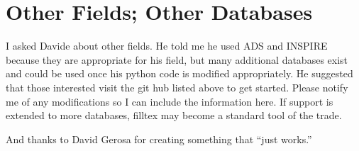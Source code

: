 \documentclass[11pt, oneside]{amsart}
\begin{document}
\section{Other Fields; Other Databases}

I asked Davide about other fields. He told me he used ADS and INSPIRE because they are appropriate for his field, but many additional databases exist and could be used once his python code is modified appropriately. He suggested that those interested visit the git hub listed above to get started. Please notify me of any modifications so I can include the information here. If support is extended to more databases, filltex may become a standard tool of the trade.

And thanks to David Gerosa for creating something that ``just works.''
\end{document}
